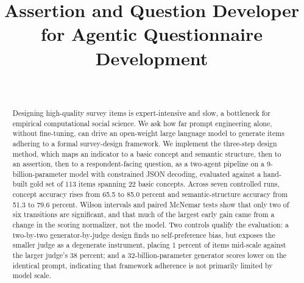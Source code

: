 \documentclass[onecolumn, 11pt]{IEEEtran}
\begin{document}
\pagestyle{plain}

\title{Assertion and Question Developer for Agentic Questionnaire Development}

\author{
\begin{minipage}{0.45\textwidth}
\centering
{}\\
\end{minipage}
\and
\hfill
\begin{minipage}{0.45\textwidth}
\centering
{}
\end{minipage}
}

\maketitle

\begin{abstract}
    Designing high-quality survey items is expert-intensive and slow, a bottleneck for empirical computational social science. We ask how far prompt engineering alone, without fine-tuning, can drive an open-weight large language model to generate items adhering to a formal survey-design framework. We implement the three-step design method, which maps an indicator to a basic concept and semantic structure, then to an assertion, then to a respondent-facing question, as a two-agent pipeline on a 9-billion-parameter model with constrained JSON decoding, evaluated against a hand-built gold set of 113 items spanning 22 basic concepts. Across seven controlled runs, concept accuracy rises from 65.5 to 85.0 percent and semantic-structure accuracy from 51.3 to 79.6 percent. Wilson intervals and paired McNemar tests show that only two of six transitions are significant, and that much of the largest early gain came from a change in the scoring normalizer, not the model. Two controls qualify the evaluation: a two-by-two generator-by-judge design finds no self-preference bias, but exposes the smaller judge as a degenerate instrument, placing 1 percent of items mid-scale against the larger judge's 38 percent; and a 32-billion-parameter generator scores lower on the identical prompt, indicating that framework adherence is not primarily limited by model scale.
\end{abstract}
\end{document}
